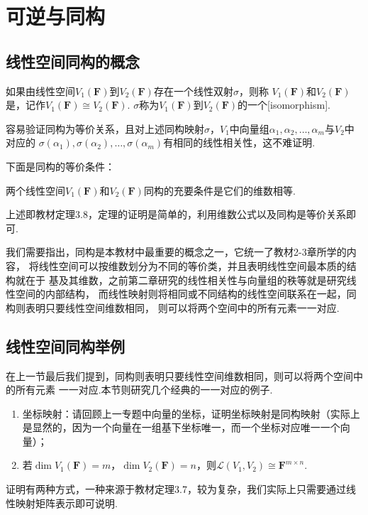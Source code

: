 \section{可逆与同构}
\subsection{线性空间同构的概念}
\begin{definition}
    如果由线性空间$V_1(\mathbf{F})$到$V_2(\mathbf{F})$存在一个线性双射$\sigma$，则称
    $V_1(\mathbf{F})$和$V_2(\mathbf{F})$是，记作$V_1(\mathbf{F}) \cong V_2(\mathbf{F})$.
    $\sigma$称为$V_1(\mathbf{F})$到$V_2(\mathbf{F})$的一个[isomorphism].
\end{definition}
容易验证同构为等价关系，且对上述同构映射$\sigma$，$V_1$中向量组$ \alpha_1,\alpha_2,\ldots,\alpha_m $与$V_2$中对应的
$ \sigma(\alpha_1),\sigma(\alpha_2),\ldots,\sigma(\alpha_m) $有相同的线性相关性，这不难证明.

下面是同构的等价条件：
\begin{theorem}
    两个线性空间$V_1(\mathbf{F})$和$V_2(\mathbf{F})$同构的充要条件是它们的维数相等.
\end{theorem}
上述即教材定理3.8，定理的证明是简单的，利用维数公式以及同构是等价关系即可.

我们需要指出，同构是本教材中最重要的概念之一，它统一了教材2-3章所学的内容，
将线性空间可以按维数划分为不同的等价类，并且表明线性空间最本质的结构就在于
基及其维数，之前第二章研究的线性相关性与向量组的秩等就是研究线性空间的内部结构，
而线性映射则将相同或不同结构的线性空间联系在一起，同构则表明只要线性空间维数相同，
则可以将两个空间中的所有元素一一对应.
\subsection{线性空间同构举例}
在上一节最后我们提到，同构则表明只要线性空间维数相同，则可以将两个空间中的所有元素
一一对应.本节则研究几个经典的一一对应的例子.
\begin{enumerate}
    \item 坐标映射：请回顾上一专题中向量的坐标，证明坐标映射是同构映射（实际上是显然的，因为一个向量在一组基下坐标唯一，而一个坐标对应唯一一个向量）；

    \item 若$\dim V_1(\mathbf{F})=m$，$\dim V_2(\mathbf{F})=n$，则$\mathcal{L}(V_1,V_2) \cong \mathbf{F}^{m \times n}$.
\end{enumerate}

证明有两种方式，一种来源于教材定理3.7，较为复杂，我们实际上只需要通过线性映射矩阵表示即可说明.


